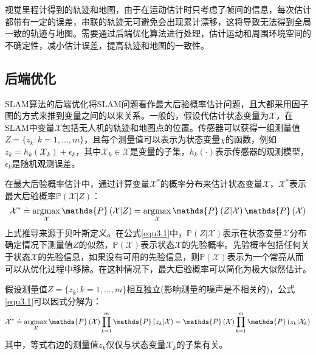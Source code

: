 视觉里程计得到的轨迹和地图，由于在运动估计时只考虑了帧间的信息，每次估计都带有一定的误差，串联的轨迹无可避免会出现累计漂移，这将导致无法得到全局一致的轨迹与地图。需要通过后端优化算法进行处理，估计运动和周围环境空间的不确定性，减小估计误差，提高轨迹和地图的一致性。


\subsection{后端优化}
SLAM算法的后端优化将SLAM问题看作最大后验概率估计问题，且大都采用因子图的方式来推到变量之间的以来关系。一般的，假设代估计状态变量为$\mathcal{X}$，在SLAM中变量$\mathcal{X}$包括无人机的轨迹和地图点的位置。传感器可以获得一组测量值$Z=\lbrace z_k:k=1,\ldots ,m\rbrace$，且每个测量值可以表示为状态变量$\chi$的函数，例如$z_k=h_k\left( \mathcal{X}_k \right)+\epsilon_k$，其中$\mathcal{X}_k \in \mathcal{X}$是变量的子集，$h_k(\cdot)$表示传感器的观测模型，$\epsilon_k$是随机观测误差。

在最大后验概率估计中，通过计算变量$\mathcal{X}^*$的概率分布来估计状态变量$\mathcal{X}$，$\mathcal{X}^*$表示最大后验概率$\mathds{P}\left(\mathcal{X} \vert Z\right)$：
\begin{equation}
\label{equ3.1}
\mathcal{X}^* 
\doteq 
\argmax \limits_{\mathcal{X}} \mathds{P}\left(\mathcal{X} \vert Z\right) 
=
\argmax \limits_{\mathcal{X}}\mathds{P}\left(Z \vert \mathcal{X}  \right)\mathds{P}\left(\mathcal{X}\right)
\end{equation}
上式推导来源于贝叶斯定义。在公式\eqref{equ3.1}中，$\mathds{P}\left(Z \vert \mathcal{X}  \right)$表示在状态变量$\mathcal{X}$分布确定情况下测量值$Z$的似然，$\mathds{P}\left(\mathcal{X}\right)$表示状态$\mathcal{X}$的先验概率。先验概率包括任何关于状态$\mathcal{X}$的先验信息，如果没有可用的先验信息，则$\mathds{P}\left(\mathcal{X}\right)$表示为一个常亮从而可以从优化过程中移除。在这种情况下，最大后验概率可以简化为极大似然估计。

假设测量值$Z=\lbrace z_k:k=1,\ldots ,m\rbrace$相互独立(影响测量的噪声是不相关的)，公式\eqref{equ3.1}可以因式分解为：
\begin{equation}
\label{equ3.2}
\mathcal{X}^* 
\doteq 
\argmax \limits_{\mathcal{X}} \mathds{P}\left(\mathcal{X}\right) \prod \limits_{k=1}^{m} \mathds{P}\left(z_k \vert \mathcal{X}  \right)
=
\mathds{P}\left(\mathcal{X}\right) \prod \limits_{k=1}^{m} \mathds{P}\left(z_k \vert \mathcal{X}_k  \right)
\end{equation}
其中，等式右边的测量值$z_k$仅仅与状态变量$\mathcal{X}_k$的子集有关。

